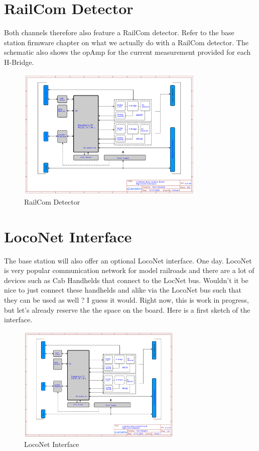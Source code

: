 \section{RailCom Detector}

Both channels therefore also feature a RailCom detector. Refer to the base station firmware chapter on what we actually do with a RailCom detector. The schematic also shows the opAmp for the current measurement provided for each H-Bridge.

\begin{figure}[htbp]
    \centering
    \includegraphics[page=4, width=0.8\textwidth]{./Schematics/Schematic_LcsNodes-Base-Station-Board.pdf}
    \caption{RailCom Detector}
\end{figure}
\FloatBarrier

\section{LocoNet Interface}

The base station will also offer an optional LocoNet interface. One day. LocoNet is very popular communication network for model railroads and there are a lot of devices such as Cab Handhelds that connect to the LocNet bus. Wouldn't it be nice to just connect these handhelds and alike via the LocoNet bus such that they can be used as well ? I guess it would. Right now, this is work in progress, but let's already reserve the the space on the board. Here is a first sketch of the interface.

\begin{figure}[htbp]
    \centering
    \includegraphics[page=5, width=0.7\textwidth]{./Schematics/Schematic_LcsNodes-Base-Station-Board.pdf}
    \caption{LocoNet Interface}
\end{figure}
\FloatBarrier

